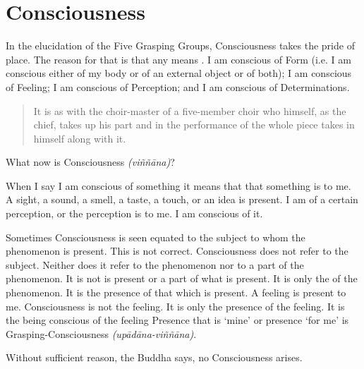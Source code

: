 \chapter{Consciousness}

In the elucidation of the Five Grasping Groups, Consciousness takes the pride of place. The reason for that is that any  means . I am conscious of Form (i.e. I am conscious either of my body or of an external object or of both); I am conscious of Feeling; I am conscious of Perception; and I am conscious of Determinations.

\begin{quote}
It is as with the choir-master of a five-member choir who himself, as the chief, takes up his part and in the performance of the whole piece takes in himself along with it.
\end{quote}

What now is Consciousness \emph{(viññāna)}?

When I say I am conscious of something it means that that something is  to me. A sight, a sound, a smell, a taste, a touch, or an idea is present. I am  of a certain perception, or the perception is  to me. I am conscious of it.

Sometimes Consciousness is seen equated to the subject to whom the phenomenon is present. This is not correct. Consciousness does not refer to the subject. Neither does it refer to the phenomenon nor to a part of the phenomenon. It is not  is present or a part of what is present. It is only the  of the phenomenon. It is the presence of that which is present. A feeling is present to me. Consciousness is not the feeling. It is only the presence of the feeling. It is the being conscious of the feeling Presence that is `mine' or presence `for me' is Grasping-Consciousness \emph{(upādāna-viññāna)}.

Without sufficient reason, the Buddha says, no Consciousness arises.

